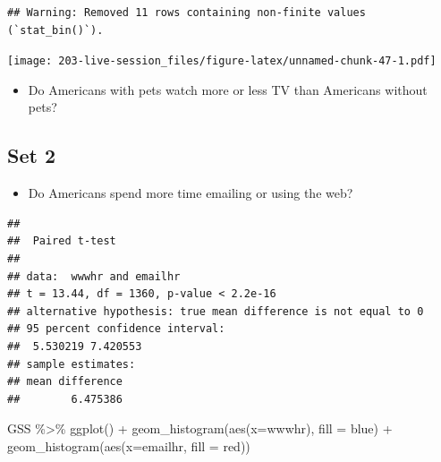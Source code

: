 \documentclass[
]{book}
\newenvironment{Shaded}{\begin{snugshade}}{\end{snugshade}}
\newcommand{\AttributeTok}[1]{\textcolor[rgb]{0.77,0.63,0.00}{#1}}
\newcommand{\ConstantTok}[1]{\textcolor[rgb]{0.00,0.00,0.00}{#1}}
\newcommand{\FunctionTok}[1]{\textcolor[rgb]{0.00,0.00,0.00}{#1}}
\newcommand{\NormalTok}[1]{#1}
\newcommand{\SpecialCharTok}[1]{\textcolor[rgb]{0.00,0.00,0.00}{#1}}
\newcommand{\StringTok}[1]{\textcolor[rgb]{0.31,0.60,0.02}{#1}}
\providecommand{\tightlist}{%
  \setlength{\itemsep}{0pt}\setlength{\parskip}{0pt}}
\theoremstyle{definition}
\theoremstyle{definition}
\theoremstyle{definition}
\theoremstyle{definition}
\theoremstyle{remark}
\begin{document}
\begin{verbatim}
## Warning: Removed 11 rows containing non-finite values (`stat_bin()`).
\end{verbatim}

\texttt{[image: 203-live-session\_files/figure-latex/unnamed-chunk-47-1.pdf]}

\begin{itemize}
\tightlist
\item
  Do Americans with pets watch more or less TV than Americans without pets?
\end{itemize}

\hypertarget{set-2}{%
\subsection{Set 2}\label{set-2}}

\begin{itemize}
\tightlist
\item
  Do Americans spend more time emailing or using the web?
\end{itemize}

\begin{Shaded}
\end{Shaded}

\begin{verbatim}
## 
##  Paired t-test
## 
## data:  wwwhr and emailhr
## t = 13.44, df = 1360, p-value < 2.2e-16
## alternative hypothesis: true mean difference is not equal to 0
## 95 percent confidence interval:
##  5.530219 7.420553
## sample estimates:
## mean difference 
##        6.475386
\end{verbatim}

\begin{Shaded}
\begin{Highlighting}[]
\NormalTok{GSS }\SpecialCharTok{\%\textgreater{}\%} 
  \FunctionTok{ggplot}\NormalTok{() }\SpecialCharTok{+} 
  \FunctionTok{geom\_histogram}\NormalTok{(}\FunctionTok{aes}\NormalTok{(}\AttributeTok{x=}\NormalTok{wwwhr), }\AttributeTok{fill =} \StringTok{\textquotesingle{}blue\textquotesingle{}}\NormalTok{) }\SpecialCharTok{+} 
  \FunctionTok{geom\_histogram}\NormalTok{(}\FunctionTok{aes}\NormalTok{(}\AttributeTok{x=}\NormalTok{emailhr, }\AttributeTok{fill =} \StringTok{\textquotesingle{}red\textquotesingle{}}\NormalTok{))}
\end{Highlighting}
\end{Shaded}
\end{document}
